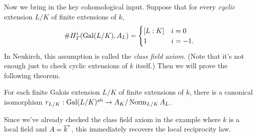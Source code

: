 \medskip
Now we bring in the key cohomological input. Suppose that for every
\emph{cyclic} extension $L/K$ of finite extensions of $k$,
\[
\#H^i_T(\operatorname{Gal}(L/K), A_L) = \begin{cases} [L:K] & i=0 \\
1 & i = -1. \end{cases}
\]
In Neukirch, this assumption is called the \emph{class field axiom}.
(Note that it's not enough just to check cyclic extensions of $k$ itself.)
Then we will prove the following theorem.
\begin{theorem}
For each finite Galois extension $L/K$ of finite extensions of $k$,
there is a canonical isomorphism $r_{L/K}: \operatorname{Gal}(L/K)^{\operatorname{ab}}
\to A_K / \operatorname{Norm}_{L/K} A_L$.
\end{theorem}
Since we've already checked the class field axiom in the example where
$k$ is a local field and $A = \overline{k}^*$, this immediately recovers the
local reciprocity law.

